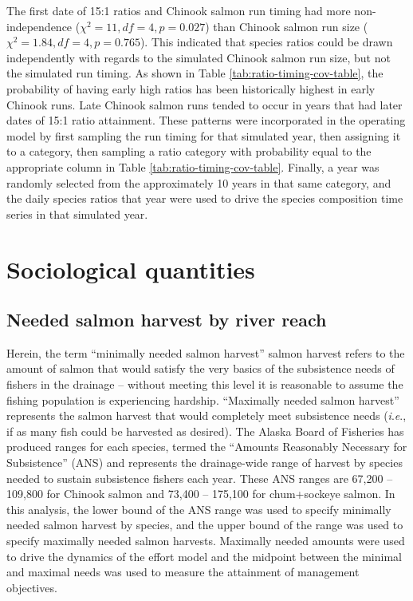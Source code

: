 \documentclass[12pt,]{book}
\theoremstyle{definition}
\theoremstyle{definition}
\theoremstyle{definition}
\theoremstyle{remark}
\begin{document}
The first date of 15:1 ratios and Chinook salmon run timing had more
non-independence (\(\chi^2 = 11, df = 4, p = 0.027\)) than Chinook
salmon run size (\(\chi^2 = 1.84, df = 4, p = 0.765\)). This indicated
that species ratios could be drawn independently with regards to the
simulated Chinook salmon run size, but not the simulated run timing. As
shown in Table \ref{tab:ratio-timing-cov-table}, the probability of
having early high ratios has been historically highest in early Chinook
runs. Late Chinook salmon runs tended to occur in years that had later
dates of 15:1 ratio attainment. These patterns were incorporated in the
operating model by first sampling the run timing for that simulated
year, then assigning it to a category, then sampling a ratio category
with probability equal to the appropriate column in Table
\ref{tab:ratio-timing-cov-table}. Finally, a year was randomly selected
from the approximately 10 years in that same category, and the daily
species ratios that year were used to drive the species composition time
series in that simulated year.

\section{Sociological quantities}\label{sociological-quantities}

\subsection{Needed salmon harvest by river reach}\label{mse-data-needs}

\noindent
Herein, the term ``minimally needed salmon harvest'' salmon harvest
refers to the amount of salmon that would satisfy the very basics of the
subsistence needs of fishers in the drainage -- without meeting this
level it is reasonable to assume the fishing population is experiencing
hardship. ``Maximally needed salmon harvest'' represents the salmon
harvest that would completely meet subsistence needs
(\emph{i}.\emph{e}., if as many fish could be harvested as desired). The
Alaska Board of Fisheries has produced ranges for each species, termed
the ``Amounts Reasonably Necessary for Subsistence'' (ANS) and
represents the drainage-wide range of harvest by species needed to
sustain subsistence fishers each year. These ANS ranges are 67,200 --
109,800 for Chinook salmon and 73,400 -- 175,100 for chum+sockeye
salmon. In this analysis, the lower bound of the ANS range was used to
specify minimally needed salmon harvest by species, and the upper bound
of the range was used to specify maximally needed salmon harvests.
Maximally needed amounts were used to drive the dynamics of the effort
model and the midpoint between the minimal and maximal needs was used to
measure the attainment of management objectives.
\end{document}
